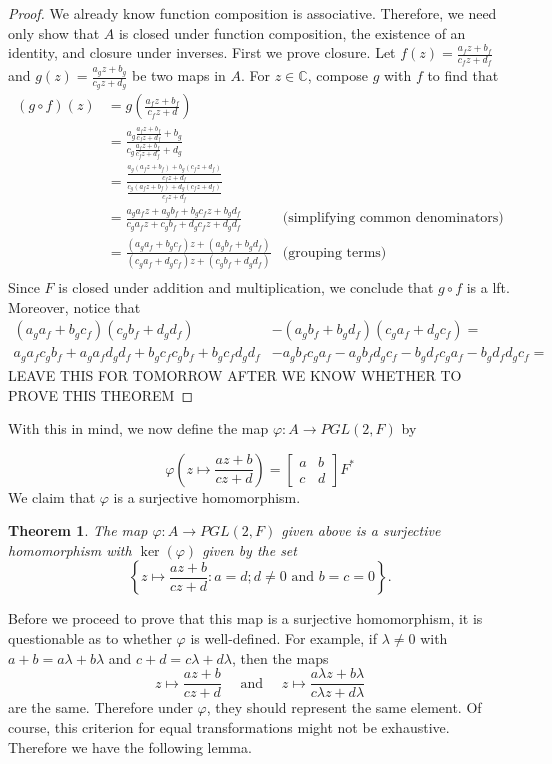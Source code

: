 \documentclass[12pt]{article}
\newcommand{\C}{\mathbb{C}}
\newcommand{\lftmat}[4]{\begin{bmatrix} {#1} & {#2} \\ {#3} & {#4} \end{bmatrix}}
\newcommand{\stanlftmat}{\lftmat{a}{b}{c}{d}}
\theoremstyle{plain}
\newtheorem{theorem}{Theorem}[section]
\theoremstyle{definition}
\begin{document}
\begin{appendices}
\begin{proof}
	We already know function composition is associative. Therefore, we need only show that $A$ is closed under function composition, the existence of an identity, and closure under inverses.
	First we prove closure. Let $f(z) = \frac{a_fz + b_f}{c_fz + d_f}$ and $g(z) = \frac{a_g z + b_g}{c_g z + d_g}$ be two maps in $A$. For $z\in\C$, compose $g$ with $f$ to find that
	\begin{align*}
		(g\circ f)(z) & = g\left(\frac{a_fz + b_f}{c_fz + d}\right)\\
		& = \frac{a_g\frac{a_fz + b_f}{c_fz + d_f} + b_g}{c_g\frac{a_fz + b_f}{c_fz + d_f} + d_g}\\
		& = \frac{\frac{a_g(a_fz+b_f)+b_g(c_fz+d_f)}{c_fz+d_f}}{\frac{c_g(a_fz+b_f)+d_g(c_fz+d_f)}{c_fz+d_f}}\\
		& = \frac{a_ga_fz + a_gb_f + b_gc_fz + b_gd_f}{c_ga_fz + c_gb_f + d_gc_fz + d_gd_f} & \text{(simplifying common denominators)}\\
		& = \frac{(a_ga_f + b_gc_f)z + (a_gb_f + b_gd_f)}{(c_ga_f + d_gc_f)z + (c_gb_f + d_gd_f)} & \text{(grouping terms)}\\
	\end{align*}
	Since $F$ is closed under addition and multiplication, we conclude that $g\circ f$ is a lft. Moreover, notice that
	\begin{align*}
	(a_ga_f + b_gc_f)(c_gb_f + d_gd_f) & - (a_gb_f + b_gd_f)(c_ga_f + d_gc_f) =\\	 a_ga_fc_gb_f + a_ga_fd_gd_f + b_gc_fc_gb_f + b_gc_fd_gd_f & - a_gb_fc_ga_f - a_gb_fd_gc_f -b_gd_fc_ga_f - b_gd_fd_gc_f =
	\end{align*}
	LEAVE THIS FOR TOMORROW AFTER WE KNOW WHETHER TO PROVE THIS THEOREM
\end{proof}	
	
With this in mind, we now define the map $\varphi\colon A\rightarrow PGL(2,F)$ by

	\[
		\varphi\left(z\mapsto \frac{az + b}{cz + d}\right) = \stanlftmat F^*
	\]
	We claim that $\varphi$ is a surjective homomorphism.
\begin{theorem}
		The map $\varphi\colon A\rightarrow PGL(2,F)$ given above is a surjective homomorphism with $\ker(\varphi)$ given by the set
		\[
			\left\lbrace z\mapsto \frac{az + b}{cz + d}\colon a = d; d \neq 0\text{ and } b = c = 0\right\rbrace.
		\]
\end{theorem}

Before we proceed to prove that this map is a surjective homomorphism, it is questionable as to whether $\varphi$ is well-defined. For example, if $\lambda \neq 0$ with $a + b = a\lambda + b\lambda$ and $c + d = c\lambda + d\lambda$, then the maps
\[
	z\mapsto\frac{az + b}{cz + d}\quad\text{ and }\quad z\mapsto\frac{a\lambda z + b\lambda}{c\lambda z + d\lambda}
\]  
are the same. Therefore under $\varphi$, they should represent the same element. Of course, this criterion for equal transformations might not be exhaustive. Therefore we have the following lemma.


\end{appendices}
\end{document}
